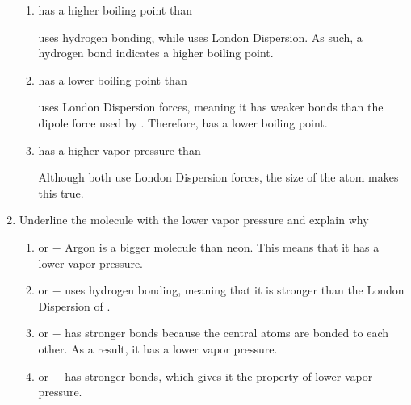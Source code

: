 \documentclass[12pt]{article}
\begin{document}
\begin{enumerate}
\begin{enumerate}
      \item {} has a higher boiling point than 
        
        \begin{center}
           uses hydrogen bonding, while  uses London Dispersion. As such, a hydrogen bond indicates a higher boiling point.
        \end{center}

      \item {} has a lower boiling point than 

        \begin{center}
           uses London Dispersion forces, meaning it has weaker bonds than the dipole force used by . Therefore,  has a lower boiling point.
        \end{center}

      \item {} has a higher vapor pressure than 
        
        \begin{center}
          Although both use London Dispersion forces, the size of the  atom makes this true.
        \end{center}

    \end{enumerate}

  \item Underline the molecule with the lower vapor pressure and explain why

    \begin{enumerate}

      \item {} or \underline{} $-$ Argon is a bigger molecule than neon. This means that it has a lower vapor pressure.

      \item \underline{} or  $-$  uses hydrogen bonding, meaning that it is stronger than the London Dispersion of .

      \item \underline{} or  $-$  has stronger bonds because the central  atoms are bonded to each other. As a result, it has a lower vapor pressure.

      \item {} or \underline{} $-$  has stronger bonds, which gives it the property of lower vapor pressure.


\end{enumerate}
\end{enumerate}
\end{document}
